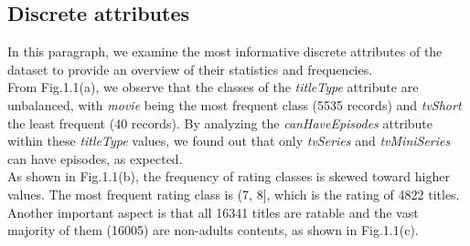 \subsection{Discrete attributes}
In this paragraph, we examine the most informative discrete attributes of the dataset to provide an overview of their statistics and frequencies. 
\\From Fig.1.1(a), we observe that the classes of the \textit{titleType} attribute are unbalanced, with \textit{movie} being the most frequent class (5535 records) and \textit{tvShort} the least frequent (40 records). By analyzing the \textit{canHaveEpisodes} attribute within these \textit{titleType} values, we found out that only \textit{tvSeries} and \textit{tvMiniSeries} can have episodes, as expected.
\\As shown in Fig.1.1(b), the frequency of rating classes is skewed toward higher values. The most frequent rating class is (7, 8], which is the rating of 4822 titles.
\\Another important aspect is that all 16341 titles are ratable and the vast majority of them (16005) are non-adults contents, as shown in Fig.1.1(c).
